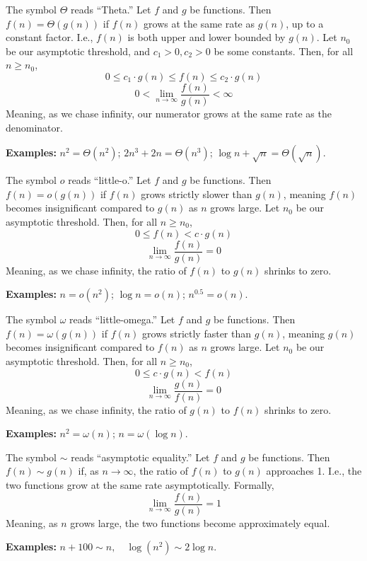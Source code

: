\begin{Def}

    The symbol $\Theta$ reads ``Theta.'' Let $f$ and $g$ be functions. Then $f(n)=\Theta(g(n))$ if $f(n)$ grows at the same rate as $g(n)$, up to a constant factor. I.e., $f(n)$ is both upper and lower bounded by $g(n)$. Let $n_0$ be our asymptotic threshold, and $c_1>0,c_2>0$ be some constants. Then, for all $n\geq n_0$,
    \large
    \[0\leq c_1\cdot g(n) \leq f(n) \leq c_2\cdot g(n)\]
    \[0<\lim_{n\to\infty}\dfrac{f(n)}{g(n)}<\infty\]
    \normalsize
    \noindent
    Meaning, as we chase infinity, our numerator grows at the same rate as the denominator.
\end{Def}
\noindent
\textbf{Examples:} $n^2=\Theta(n^2)$; $2n^3+2n=\Theta(n^3)$; $\log n+\sqrt{n}=\Theta(\sqrt{n})$.
\begin{Def}

    The symbol $o$ reads ``little-o.'' Let $f$ and $g$ be functions. Then $f(n)=o(g(n))$ if $f(n)$ grows strictly slower than $g(n)$, meaning $f(n)$ becomes insignificant compared to $g(n)$ as $n$ grows large. Let $n_0$ be our asymptotic threshold. Then, for all $n\geq n_0$,
    \large
    \[0\leq f(n) < c \cdot g(n)\]
    \[\lim_{n\to\infty}\dfrac{f(n)}{g(n)}=0\]
    \normalsize
    \noindent
    Meaning, as we chase infinity, the ratio of $f(n)$ to $g(n)$ shrinks to zero.
\end{Def}
\noindent
\textbf{Examples:} $n=\!o(n^2)$; $\log n=\!o(n)$; $n^{0.5}=\!o(n)$.
\begin{Def}

    The symbol $\omega$ reads ``little-omega.'' Let $f$ and $g$ be functions. Then $f(n)=\omega(g(n))$ if $f(n)$ grows strictly faster than $g(n)$, meaning $g(n)$ becomes insignificant compared to $f(n)$ as $n$ grows large. Let $n_0$ be our asymptotic threshold. Then, for all $n\geq n_0$,
    \large
    \[0\leq c \cdot g(n) < f(n)\]
    \[\lim_{n\to\infty}\dfrac{g(n)}{f(n)}=0\]
    \normalsize
    \noindent
    Meaning, as we chase infinity, the ratio of $g(n)$ to $f(n)$ shrinks to zero.
\end{Def}
\noindent
\textbf{Examples:} $n^2=\omega(n)$; $n=\omega(\log n)$.

\newpage 

\begin{Def}

    The symbol \( \sim \) reads ``asymptotic equality.'' Let $f$ and $g$ be functions. Then $f(n) \sim g(n)$ if, as $n \to \infty$, the ratio of $f(n)$ to $g(n)$ approaches 1. I.e., the two functions grow at the same rate asymptotically. Formally,
    \large
    \[\lim_{n\to\infty}\dfrac{f(n)}{g(n)}=1\]
    \normalsize
    \noindent
    Meaning, as $n$ grows large, the two functions become approximately equal.
\end{Def}
\noindent
\textbf{Examples:} $n + 100 \sim n, \quad \log(n^2) \sim 2\log n.$


